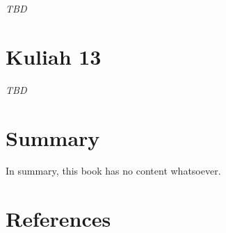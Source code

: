\documentclass[
  letterpaper,
  DIV=11,
  numbers=noendperiod]{scrreprt}
\begin{document}
\emph{TBD}


\chapter{Kuliah 13}\label{kuliah-13}

\emph{TBD}


\chapter{Summary}\label{summary}

In summary, this book has no content whatsoever.


\chapter*{References}\label{references}


\label{refs}
\end{document}

